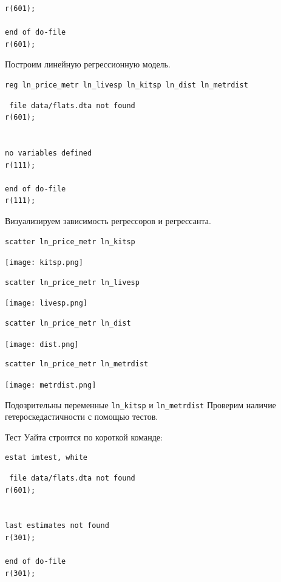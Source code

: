 \documentclass[]{book}
\begin{document}
\begin{verbatim}
r(601);

end of do-file
r(601);
\end{verbatim}

Построим линейную регрессионную модель.

\begin{verbatim}
reg ln_price_metr ln_livesp ln_kitsp ln_dist ln_metrdist
\end{verbatim}

\begin{verbatim}
 file data/flats.dta not found
r(601);


no variables defined
r(111);

end of do-file
r(111);
\end{verbatim}

Визуализируем зависимость регрессоров и регрессанта.

\begin{verbatim}
scatter ln_price_metr ln_kitsp
\end{verbatim}

\texttt{[image: kitsp.png]}

\begin{verbatim}
scatter ln_price_metr ln_livesp
\end{verbatim}

\texttt{[image: livesp.png]}

\begin{verbatim}
scatter ln_price_metr ln_dist
\end{verbatim}

\texttt{[image: dist.png]}

\begin{verbatim}
scatter ln_price_metr ln_metrdist
\end{verbatim}

\texttt{[image: metrdist.png]}

Подозрительны переменные \texttt{ln\_kitsp} и \texttt{ln\_metrdist}
Проверим наличие гетероскедастичности с помощью тестов.

Тест Уайта строится по короткой команде:

\begin{verbatim}
estat imtest, white
\end{verbatim}

\begin{verbatim}
 file data/flats.dta not found
r(601);


last estimates not found
r(301);

end of do-file
r(301);
\end{verbatim}
\end{document}
